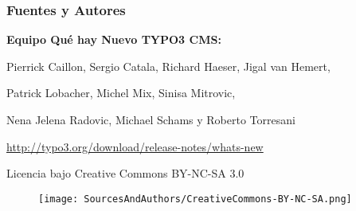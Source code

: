 \begin{frame}[fragile]
	\frametitle{Fuentes y Autores}

	\vspace{-0.6cm}

	\centerline{\textbf{Equipo Qué hay Nuevo TYPO3 CMS:}}

	\begin{center}
		\centerline{Pierrick Caillon, Sergio Catala, Richard Haeser, Jigal van Hemert,}
		\centerline{Patrick Lobacher, Michel Mix, Sinisa Mitrovic,}
		\centerline{Nena Jelena Radovic, Michael Schams y Roberto Torresani}
	\end{center}

	\vspace{0.4cm}

	\smaller\begin{center}\url{http://typo3.org/download/release-notes/whats-new}\end{center}\normalsize

	\vspace{1cm}

	\smaller\begin{center}Licencia bajo Creative Commons BY-NC-SA 3.0\end{center}\normalsize
	\begin{figure}\vspace*{-0.4cm}
		\texttt{[image: SourcesAndAuthors/CreativeCommons-BY-NC-SA.png]}
	\end{figure}

\end{frame}

